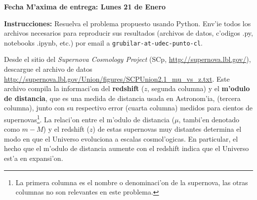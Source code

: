 \documentclass[11pt]{exam}
\begin{document}
\firstpageheadrule
\runningheadrule
{}
\cfoot{ }
\begin{flushleft}
\vspace{0.2in}
\vspace{0.25cm}
\end{flushleft}

\begin{center}
\textbf{Fecha M'axima de entrega: Lunes 21 de Enero}
\end{center}
\textbf{Instrucciones:} Resuelva el problema propuesto usando Python. Env'ie todos los archivos necesarios para reproducir sus resultados (archivos de datos, c'odigos .py, notebooks .ipynb, etc.) por email a \texttt{grubilar-at-udec-punto-cl}.

\bigskip


 Desde el sitio del \textit{Supernova Cosmology Project} (SCp,
\url{http://supernova.lbl.gov/}), descargue el archivo de datos  \url{http://supernova.lbl.gov/Union/figures/SCPUnion2.1_mu_vs_z.txt}.
Este archivo compila la informaci'on del \textbf{redshift} ($z$, segunda columna) y el \textbf{m'odulo de distancia}, que es una medida de distancia usada en Astronom'ia, (tercera columna), junto con su respectivo error (cuarta columna) medidos para cientos
de supernovas\footnote{La primera columna es el nombre o denominaci'on de
la supernova, las otras columnas no son relevantes en este problema.}.
La relaci'on entre el m'odulo de distancia ($\mu$, tambi'en denotado como $m-M$) y el redshift ($z$) de estas
supernovas muy distantes determina el modo en que el Universo evoluciona a escalas cosmol'ogicas. En particular, el hecho que el m'odulo de distancia aumente con el redshift indica que el Universo est'a en expansi'on. 
\end{document}
